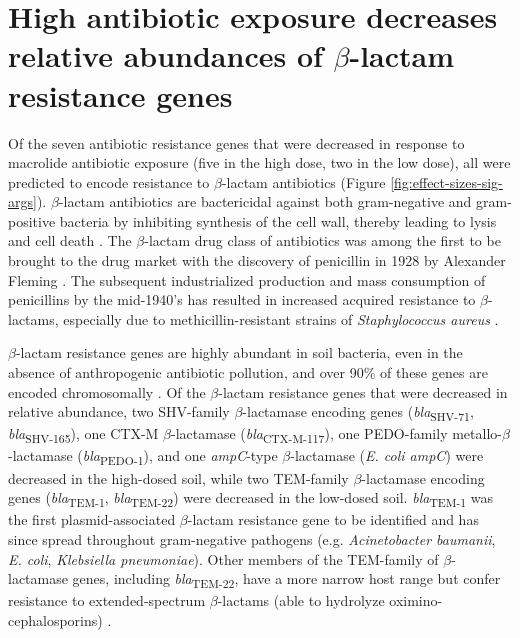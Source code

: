 \section{High antibiotic exposure decreases relative abundances of $\beta$-lactam resistance genes}

Of the seven antibiotic resistance genes that were decreased in response to macrolide antibiotic exposure (five in the high dose, two in the low dose), all were predicted to encode resistance to $\beta$-lactam antibiotics (Figure \ref{fig:effect-sizes-sig-args}).
$\beta$-lactam antibiotics are bactericidal against both gram-negative and gram-positive bacteria by inhibiting synthesis of the cell wall, thereby leading to lysis and cell death \parencite{Balsalobre.2019}.
The $\beta$-lactam drug class of antibiotics was among the first to be brought to the drug market with the discovery of penicillin in 1928 by Alexander Fleming \parencite{Fleming.1929}.
The subsequent industrialized production and mass consumption of penicillins by the mid-1940's has resulted in increased acquired resistance to $\beta$-lactams, especially due to methicillin-resistant strains of \textit{Staphylococcus aureus} \parencite{PublicHealthAgencyofCanada.2020}.

$\beta$-lactam resistance genes are highly abundant in soil bacteria, even in the absence of anthropogenic antibiotic pollution, and over 90\% of these genes are encoded chromosomally \parencite{Dunivin.2019, vanGoethem.2018, Mindlin.2017}.
Of the $\beta$-lactam resistance genes that were decreased in relative abundance, two SHV-family $\beta$-lactamase encoding genes (\textit{bla}\textsubscript{SHV-71}, \textit{bla}\textsubscript{SHV-165}), one CTX-M $\beta$-lactamase (\textit{bla}\textsubscript{CTX-M-117}), one PEDO-family metallo-$\beta$-lactamase (\textit{bla}\textsubscript{PEDO-1}), and one \textit{ampC}-type $\beta$-lactamase (\textit{E. coli ampC}) were decreased in the high-dosed soil, while two TEM-family $\beta$-lactamase encoding genes (\textit{bla}\textsubscript{TEM-1}, \textit{bla}\textsubscript{TEM-22}) were decreased in the low-dosed soil.
\textit{bla}\textsubscript{TEM-1} was the first plasmid-associated $\beta$-lactam resistance gene to be identified and has since spread throughout gram-negative pathogens (e.g. \textit{Acinetobacter baumanii}, \textit{E. coli}, \textit{Klebsiella pneumoniae}).
Other members of the TEM-family of $\beta$-lactamase genes, including \textit{bla}\textsubscript{TEM-22}, have a more narrow host range but confer resistance to extended-spectrum $\beta$-lactams (able to hydrolyze oximino-cephalosporins) \parencite{Bradford.2001, Garlet.1993}.

